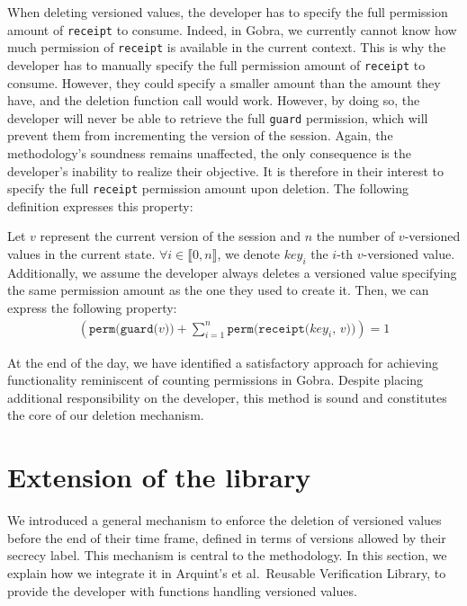 When deleting versioned values, the developer has to specify the full permission amount of \texttt{receipt} to consume.
Indeed, in Gobra, we currently cannot know how much permission of \texttt{receipt} is available in the current context.
This is why the developer has to manually specify the full permission amount of \texttt{receipt} to consume.
However, they could specify a smaller amount than the amount they have, and the deletion function call would work.
However, by doing so, the developer will never be able to retrieve the full \texttt{guard} permission, which will prevent them from incrementing the version of the session.
Again, the methodology's soundness remains unaffected, the only consequence is the developer's inability to realize their objective.
It is therefore in their interest to specify the full \texttt{receipt} permission amount upon deletion.
The following definition expresses this property:

\begin{definition}\label{def:sum-perm-eq-1}

    Let $v$ represent the current version of the session and $n$ the number of $v$-versioned values in the current state. $\forall i \in \llbracket 0, n \rrbracket$, we denote $key_i$ the $i$-th $v$-versioned value.
    Additionally, we assume the developer always deletes a versioned value specifying the same permission amount as the one they used to create it.
    Then, we can express the following property:
    \begin{align*}
        \left(\texttt{perm(guard($v$))} + \sum_{i=1}^n \texttt{perm(receipt($key_i$, $v$))}\right) = 1
    \end{align*}

\end{definition}

At the end of the day, we have identified a satisfactory approach for achieving functionality reminiscent of counting permissions in Gobra. Despite placing additional responsibility on the developer, this method is sound and constitutes the core of our deletion mechanism.

\section{Extension of the library}
\label{sec:extension-of-the-library}

We introduced a general mechanism to enforce the deletion of versioned values before the end of their time frame, defined in terms of versions allowed by their secrecy label.
This mechanism is central to the methodology.
In this section, we explain how we integrate it in Arquint's et al.\ Reusable Verification Library, to provide the developer with functions handling versioned values.

